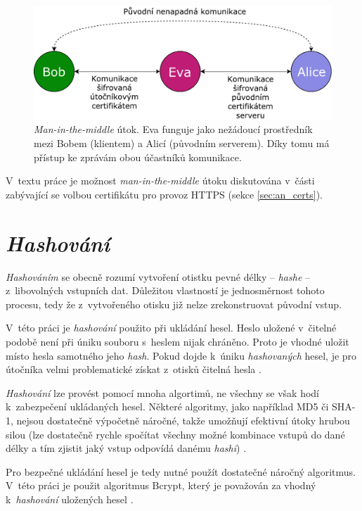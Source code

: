 \begin{figure}[h!]
    \centering
    \includegraphics[width=\textwidth]{images/mitm.pdf}
    \caption[\textit{Man-in-the-middle} útok]{\textit{Man-in-the-middle} útok. Eva funguje jako nežádoucí prostředník mezi Bobem (klientem) a Alicí (původním serverem). Díky tomu má přístup ke zprávám obou účastníků komunikace. \cite{mitm}}
    \label{fig:mitm}
\end{figure}

V~textu práce je možnost \textit{man-in-the-middle} útoku diskutována v~části zabývající se volbou certifikátu pro provoz HTTPS (sekce \ref{sec:an_certs}).

\section{\textit{Hashování}}

\textit{Hashováním} se obecně rozumí vytvoření otistku pevné délky -- \textit{hashe} -- z~libovolných vstupních dat. Důležitou vlastností je jednosměrnost tohoto procesu, tedy že z~vytvořeného otisku již nelze zrekonstruovat původní vstup. \cite{hash_crackstation}

V~této práci je \textit{hashování} použito při ukládání hesel. Heslo uložené v~čitelné podobě není při úniku souboru s~heslem nijak chráněno. Proto je vhodné uložit místo hesla samotného jeho \textit{hash}. Pokud dojde k~úniku \textit{hashovaných} hesel, je pro útočníka velmi problematické  získat z~otisků čitelná hesla \cite{hash_crackstation}.

\textit{Hashování} lze provést pomocí mnoha algortimů, ne všechny se však hodí k~zabezpečení ukládaných hesel. Některé algoritmy, jako například MD5 či SHA-1, nejsou dostatečně výpočetně náročné, takže umožňují efektivní útoky hrubou silou (lze dostatečně rychle spočítat všechny možné kombinace vstupů do dané délky a tím zjistit jaký vstup odpovídá danému \textit{hashi}) \cite{hash_crackstation}. 

Pro bezpečné ukládání hesel je tedy nutné použít dostatečné náročný algoritmus. V~této práci je použit algoritmus Bcrypt, který je považován za vhodný k~\textit{hashování} uložených hesel \cite{hash_crackstation}.

